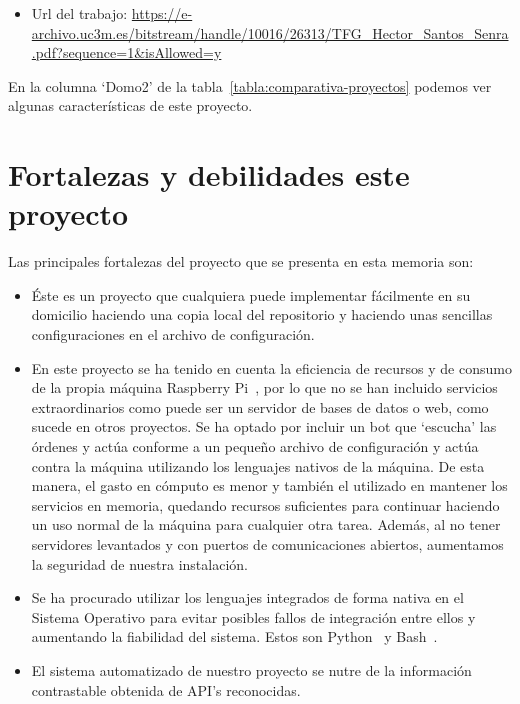 \begin{itemize}
    \item Url del trabajo: \url{https://e-archivo.uc3m.es/bitstream/handle/10016/26313/TFG_Hector_Santos_Senra.pdf?sequence=1&isAllowed=y}
\end{itemize}

En la columna `Domo2' de la tabla~\ref{tabla:comparativa-proyectos} podemos ver algunas características de este proyecto.

\section{Fortalezas y debilidades este proyecto}

Las principales fortalezas del proyecto que se presenta en esta memoria son:

\begin{itemize}
\item
    Éste es un proyecto que cualquiera puede implementar fácilmente en su domicilio haciendo una copia local del repositorio y haciendo unas sencillas configuraciones en el archivo de configuración.
    
\item
    En este proyecto se ha tenido en cuenta la eficiencia de recursos y de consumo de la propia máquina Raspberry Pi~\cite{misc:RbPWeb}, por lo que no se han incluido servicios extraordinarios como puede ser un servidor de bases de datos o web, como sucede en otros proyectos. Se ha optado por incluir un bot que `escucha' las órdenes y actúa conforme a un pequeño archivo de configuración y actúa contra la máquina utilizando los lenguajes nativos de la máquina. De esta manera, el gasto en cómputo es menor y también el utilizado en mantener los servicios en memoria, quedando recursos suficientes para continuar haciendo un uso normal de la máquina para cualquier otra tarea.
    Además, al no tener servidores levantados y con puertos de comunicaciones abiertos, aumentamos la seguridad de nuestra instalación.

\item
    Se ha procurado utilizar los lenguajes integrados de forma nativa en el Sistema Operativo para evitar posibles fallos de integración entre ellos y aumentando la fiabilidad del sistema. Estos son Python~\cite{misc:Python} y Bash~\cite{misc:Linux}. 
    
\item
    El sistema automatizado de nuestro proyecto se nutre de la información contrastable obtenida de API's reconocidas.
    

\end{itemize}
